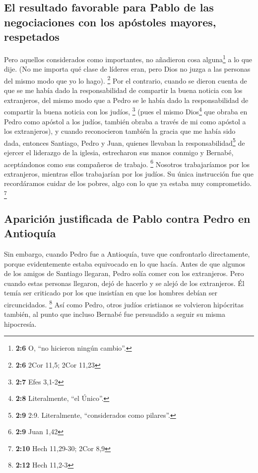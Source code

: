 \hypertarget{el-resultado-favorable-para-pablo-de-las-negociaciones-con-los-apuxf3stoles-mayores-respetados}{%
\subsection{El resultado favorable para Pablo de las negociaciones con
los apóstoles mayores,
respetados}\label{el-resultado-favorable-para-pablo-de-las-negociaciones-con-los-apuxf3stoles-mayores-respetados}}

 Pero aquellos considerados como importantes, no añadieron
cosa alguna\footnote{\textbf{2:6} O, ``no hicieron ningún cambio''.} a
lo que dije. (No me importa qué clase de líderes eran, pero Dios no
juzga a las personas del mismo modo que yo lo hago). \footnote{\textbf{2:6}
  2Cor 11,5; 2Cor 11,23}  Por el contrario, cuando se
dieron cuenta de que se me había dado la responsabilidad de compartir la
buena noticia con los extranjeros, del mismo modo que a Pedro se le
había dado la responsabilidad de compartir la buena noticia con los
judíos, \footnote{\textbf{2:7} Efes 3,1-2}  (pues el mismo
Dios\footnote{\textbf{2:8} Literalmente, ``el Único''.} que obraba en
Pedro como apóstol a los judíos, también obraba a través de mi como
apóstol a los extranjeros),  y cuando reconocieron también
la gracia que me había sido dada, entonces Santiago, Pedro y Juan,
quienes llevaban la responsabilidad\footnote{\textbf{2:9} 2:9.
  Literalmente, ``considerados como pilares''.} de ejercer el liderazgo
de la iglesia, estrecharon sus manos conmigo y Bernabé, aceptándonos
como sus compañeros de trabajo. \footnote{\textbf{2:9} Juan 1,42}
 Nosotros trabajaríamos por los extranjeros, mientras
ellos trabajarían por los judíos. Su única instrucción fue que
recordáramos cuidar de los pobres, algo con lo que ya estaba muy
comprometido. \footnote{\textbf{2:10} Hech 11,29-30; 2Cor 8,9}

\hypertarget{apariciuxf3n-justificada-de-pablo-contra-pedro-en-antioquuxeda}{%
\subsection{Aparición justificada de Pablo contra Pedro en
Antioquía}\label{apariciuxf3n-justificada-de-pablo-contra-pedro-en-antioquuxeda}}

 Sin embargo, cuando Pedro fue a Antioquía, tuve que
confrontarlo directamente, porque evidentemente estaba equivocado en lo
que hacía.  Antes de que algunos de los amigos de
Santiago llegaran, Pedro solía comer con los extranjeros. Pero cuando
estas personas llegaron, dejó de hacerlo y se alejó de los extranjeros.
Él temía ser criticado por los que insistían en que los hombres debían
ser circuncidados. \footnote{\textbf{2:12} Hech 11,2-3} 
Así como Pedro, otros judíos cristianos se volvieron hipócritas también,
al punto que incluso Bernabé fue persuadido a seguir su misma
hipocresía.

